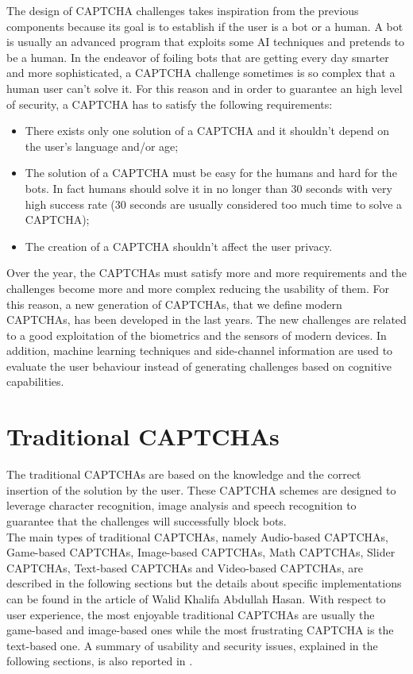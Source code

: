 The design of CAPTCHA challenges takes inspiration from the previous components because its goal is to establish if the user is a bot or a human. A bot is usually an advanced program that exploits some AI techniques and pretends to be a human. In the endeavor of foiling bots that are getting every day smarter and more sophisticated, a CAPTCHA challenge sometimes is so complex that a human user can't solve it. For this reason and in order to guarantee an high level of security, a CAPTCHA has to satisfy the following requirements:
\begin{itemize}
	\item{There exists only one solution of a CAPTCHA and it shouldn't depend on the user's language and/or age;}
	\item{The solution of a CAPTCHA must be easy for the humans and hard for the bots. In fact humans should solve it in no longer than 30 seconds with very high success rate (30 seconds are usually considered too much time to solve a CAPTCHA);}
	\item{The creation of a CAPTCHA shouldn't affect the user privacy.}
\end{itemize}
Over the year, the CAPTCHAs must satisfy more and more requirements and the challenges become more and more complex reducing the usability of them. For this reason, a new generation of CAPTCHAs, that we define modern CAPTCHAs, has been developed in the last years. The new challenges are related to a good exploitation of the biometrics and the sensors of modern devices. In addition, machine learning techniques and side-channel information are used to evaluate the user behaviour instead of generating challenges based on cognitive capabilities. 

\section{Traditional CAPTCHAs}
The traditional CAPTCHAs are based on the knowledge and the correct insertion of the solution by the user. These CAPTCHA schemes are designed to leverage character recognition, image analysis and speech recognition to guarantee that the challenges will successfully block bots.\\
The main types of traditional CAPTCHAs, namely Audio-based CAPTCHAs, Game-based CAPTCHAs, Image-based CAPTCHAs, Math CAPTCHAs, Slider CAPTCHAs, Text-based CAPTCHAs and Video-based CAPTCHAs, are described in the following sections but the details about specific implementations can be found in the article of Walid Khalifa Abdullah Hasan\cite{survey_advanced_CAPTCHA}. With respect to user experience, the most enjoyable traditional CAPTCHAs are usually the game-based and image-based ones while the most frustrating CAPTCHA is the text-based one\cite{usability_CAPTCHA}. A summary of usability and security issues, explained in the following sections, is also reported in .

